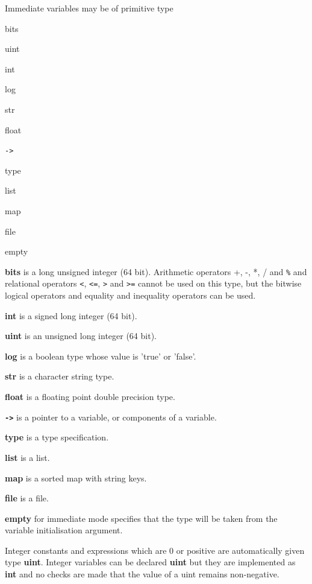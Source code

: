         Immediate variables may be of primitive type
        \blist
        \item   bits
        \item   uint
        \item   int
        \item   log
        \item   str
        \item   float
        \item   \verb'->'
        \item   type
        \item   list
        \item   map
        \item   file
        \item   empty
        \blend

        {\bf bits} is a long unsigned integer (64 bit). Arithmetic operators
        +, -, *, / and \verb'%' and relational operators \verb'<', \verb'<=',
        \verb'>' and  \verb'>=' cannot be used on this type, but the bitwise
        logical operators and equality and inequality operators can be used.

        {\bf int} is a signed long integer (64 bit).

        {\bf uint} is an unsigned long integer (64 bit).

        {\bf log} is a boolean type whose value is 'true' or 'false'.

        {\bf str} is a character string type.

        {\bf float} is a floating point double precision type.

        {\bf \verb'->'} is a pointer to a variable, or components of a variable.

        {\bf type} is a type specification.

        {\bf list} is a list.

        {\bf map} is a sorted map with string keys.

        {\bf file} is a file.

        {\bf empty} for immediate mode specifies that the type will be taken from
        the variable initialisation argument.

        Integer constants and expressions which are 0 or positive are automatically
        given type {\bf uint}. Integer variables can be declared {\bf uint} but
        they are implemented as {\bf int} and no checks are made that the value of
        a uint remains non-negative.

